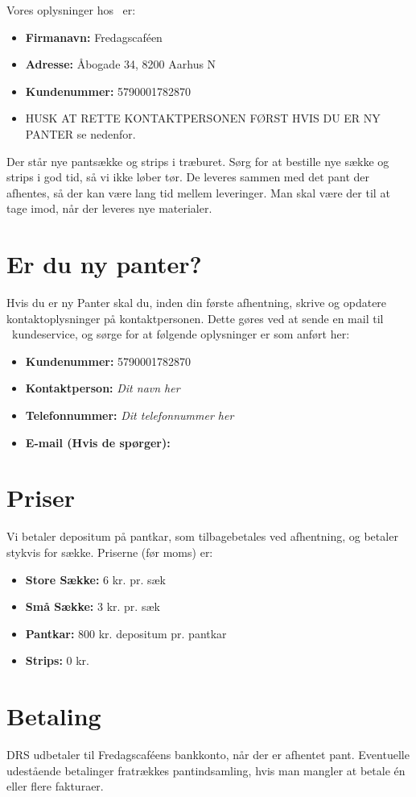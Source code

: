 Vores oplysninger hos \DRS~er:
\begin{itemize}
		\item \textbf{Firmanavn:} Fredagscaféen
		\item \textbf{Adresse:} Åbogade 34, 8200 Aarhus N
		\item \textbf{Kundenummer:} 5790001782870
		\item HUSK AT RETTE KONTAKTPERSONEN FØRST HVIS DU ER NY PANTER se nedenfor.
\end{itemize}

Der står nye pantsække og strips i træburet. Sørg for at bestille nye sække og strips i god tid, så vi ikke løber tør. De leveres sammen med det pant der afhentes, så der kan være lang tid mellem leveringer. Man skal være der til at tage imod, når der leveres nye materialer.


\section{Er du ny panter?}
\label{sec:Er du ny Panter?}

Hvis du er ny Panter skal du, inden din første afhentning, skrive og opdatere kontaktoplysninger på kontaktpersonen.
Dette gøres ved at sende en mail til \DRS~kundeservice, og sørge for at følgende oplysninger er som anført her:

\begin{itemize}
	\item \textbf{Kundenummer:} 5790001782870
	\item \textbf{Kontaktperson:} \textit{Dit navn her}
	\item \textbf{Telefonnummer:} \textit{Dit telefonnummer her}
	\item \textbf{E-mail (Hvis de spørger):} \bestmail
\end{itemize}

\section{Priser}
Vi betaler depositum på pantkar, som tilbagebetales ved afhentning, og betaler stykvis for sække. Priserne (før moms) er:
\begin{itemize}
	\item \textbf{Store Sække:} 6 kr. pr. sæk
	\item \textbf{Små Sække:} 3 kr. pr. sæk
	\item \textbf{Pantkar:} 800 kr. depositum pr. pantkar
	\item \textbf{Strips:} 0 kr.
\end{itemize}


\section{Betaling}
DRS udbetaler til Fredagscaféens bankkonto, når der er afhentet pant. Eventuelle udestående betalinger fratrækkes pantindsamling, hvis man mangler at betale én eller flere fakturaer.







